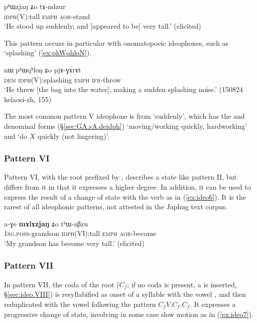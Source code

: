   \begin{exe} 
\ex  \label{ex:ideo5}
\gll  pʰɯzjaŋ ʑo tɤ-ndzur   \\
\textsc{idph}(V):tall \textsc{emph} \textsc{aor}-stand \\
\glt `He stood up suddenly, and [appeared to be] very tall.'  (elicited)
\end{exe}
 
This pattern occurs in particular with onomatopoeic ideophones, such as  `splashing' (\ref{ex:phWqhloN}).

  \begin{exe} 
\ex  \label{ex:phWqhloN}
\gll nɯ pʰɯqʰloŋ ʑo pjɤ-ɣɤrɤt \\
\textsc{dem} \textsc{idph}(V):splashing \textsc{emph} \textsc{ifr}-throw \\
\glt `He threw [the bag into the water], making a sudden splashing noise.' (150824 kelaosi-zh, 155)
 \end{exe}
 
 The most common pattern V ideophone is   from  `suddenly', which has  the  and   denominal forms (§\ref{sec:GA.sA.deidph})  `moving/working quickly, hardworking' and  `do $X$ quickly (not lingering)'.

\subsubsection{Pattern VI} \label{sec:ideo.VI}
Pattern VI, with the root prefixed by , describes a state like pattern II, but differs from it in that it expresses a higher degree. In addition, it can be used to express the result of a change of state with the verb  as in (\ref{ex:ideo6}). It is the rarest of all ideophonic patterns, not attested in the Japhug text corpus.

 \begin{exe} 
\ex  \label{ex:ideo6}
\gll a-ɣe \textbf{mɤlɤzjaŋ} ʑo tʰɯ-aβzu   \\
\textsc{1sg}.\textsc{poss}-grandson \textsc{idph}(VI):tall \textsc{emph} \textsc{aor}-become \\
\glt `My grandson has become very tall.'  (elicited)
 \end{exe}

  \subsubsection{Pattern VII} \label{sec:ideo.VII}
In pattern VII, the coda of the root ($C_f$; if no coda is present, a  is inserted, §\ref{sec:ideo.VIII}) is resyllabified as onset of a syllable with the vowel , and then reduplicated with the vowel  following the pattern $C_fV$.$C_f$.$C_f$. It  expresses a progressive change of state, involving in some case slow motion as in (\ref{ex:ideo7}).
 
